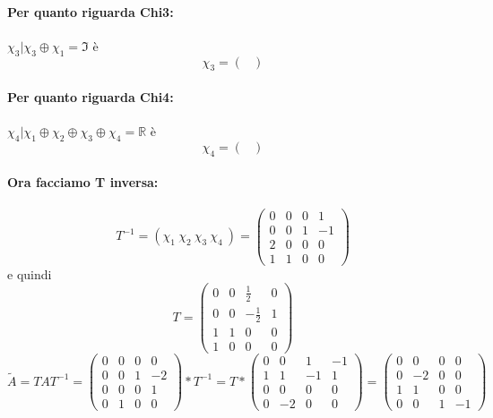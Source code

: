 \documentclass{article}
\begin{document}
\paragraph{Per quanto riguarda Chi3:} $ \chi_3 | \chi_3 \oplus \chi_1 = \mathfrak{I} $ è \[ \chi_3 = \left(\begin{matrix}\end{matrix}\right) \]

\paragraph{Per quanto riguarda Chi4:} $ \chi_4 | \chi_1 \oplus \chi_2 \oplus  \chi_3 \oplus \chi_4 = \mathbb{R} $ è \[ \chi_4 = \left(\begin{matrix}\end{matrix}\right) \]
\paragraph{Ora facciamo T inversa:} \[ T^{-1} = (\chi_1\ \chi_2\ \chi_3\ \chi_4\ ) = \left(\begin{matrix}0 & 0 & 0 & 1\\0 & 0 & 1 & -1\\2 & 0 & 0 & 0\\1 & 1 & 0 & 0\end{matrix}\right) \]
e quindi \[T = \left(\begin{matrix}0 & 0 & \frac{1}{2} & 0\\0 & 0 & - \frac{1}{2} & 1\\1 & 1 & 0 & 0\\1 & 0 & 0 & 0\end{matrix}\right)\]
\[ \widetilde{A} = TAT^{-1} = \left(\begin{matrix}0 & 0 & 0 & 0\\0 & 0 & 1 & -2\\0 & 0 & 0 & 1\\0 & 1 & 0 & 0\end{matrix}\right) * T^{-1} = T*\left(\begin{matrix}0 & 0 & 1 & -1\\1 & 1 & -1 & 1\\0 & 0 & 0 & 0\\0 & -2 & 0 & 0\end{matrix}\right) =\left(\begin{matrix}0 & 0 & 0 & 0\\0 & -2 & 0 & 0\\1 & 1 & 0 & 0\\0 & 0 & 1 & -1\end{matrix}\right) \]
\end{document}
